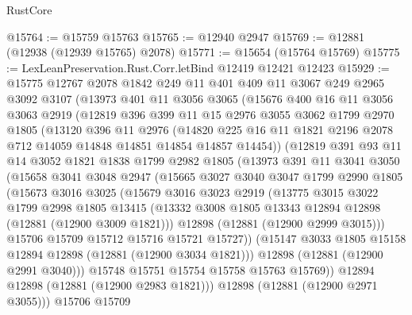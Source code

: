 \begin{lexlean}{RustCore}
\begin{coremodule}
@15764 := @15759 @15763
@15765 := @12940 @2947
@15769 := @12881 (@12938 (@12939 @15765) @2078)
@15771 := @15654 (@15764 @15769)
@15775 := LexLeanPreservation.Rust.Corr.letBind @12419 @12421 @12423
@15929 := @15775
    @12767
    @2078
    @1842
    @249
    @11
    @401
    @409
    @11
    @3067
    @249
    @2965
    @3092
    @3107
    (@13973
      @401
      @11
      @3056
      @3065
      (@15676
        @400
        @16
        @11
        @3056
        @3063
        @2919
        (@12819
          @396
          @399
          @11
          @15
          @2976
          @3055
          @3062
          @1799
          @2970
          @1805
          (@13120
            @396
            @11
            @2976
            (@14820 @225 @16 @11 @1821 @2196 @2078 @712 @14059 @14848 @14851 @14854 @14857 @14454))
          (@12819
            @391
            @93
            @11
            @14
            @3052
            @1821
            @1838
            @1799
            @2982
            @1805
            (@13973
              @391
              @11
              @3041
              @3050
              (@15658
                @3041
                @3048
                @2947
                (@15665
                  @3027
                  @3040
                  @3047
                  @1799
                  @2990
                  @1805
                  (@15673
                    @3016
                    @3025
                    (@15679
                      @3016
                      @3023
                      @2919
                      (@13775
                        @3015
                        @3022
                        @1799
                        @2998
                        @1805
                        @13415
                        (@13332 @3008 @1805 @13343 @12894 @12898 (@12881 (@12900 @3009 @1821)))
                        @12898
                        (@12881 (@12900 @2999 @3015)))
                      @15706
                      @15709
                      @15712
                      @15716
                      @15721
                      @15727))
                  (@15147 @3033 @1805 @15158 @12894 @12898 (@12881 (@12900 @3034 @1821)))
                  @12898
                  (@12881 (@12900 @2991 @3040)))
                @15748
                @15751
                @15754
                @15758
                @15763
                @15769))
            @12894
            @12898
            (@12881 (@12900 @2983 @1821)))
          @12898
          (@12881 (@12900 @2971 @3055)))
        @15706
        @15709

\end{coremodule}
\end{lexlean}
